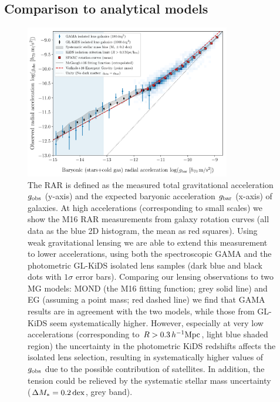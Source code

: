 \documentclass[usenatbib]{mnras}
\newcommand{\hMpc}{\, h^{-1}{\rm{Mpc}} }
\newcommand{\un}[1]{_{\rm #1}}
\newcommand{\dex}{\, {\rm dex}}
\begin{document}
\subsection{Comparison to analytical models}
\label{sec:results-analytical}

\begin{figure}
	\includegraphics[width=0.8\textwidth]{Figures/RAR_KiDS+GAMA+Verlinde_Nobins_isolated_zoomout.pdf}
	\caption{The RAR is defined as the measured total gravitational acceleration $g\un{obs}$ (y-axis) and the expected baryonic acceleration $g\un{bar}$ (x-axis) of galaxies. At high accelerations (corresponding to small scales) we show the M16 RAR measurements from galaxy rotation curves (all data as the blue 2D histogram, the mean as red squares). Using weak gravitational lensing we are able to extend this measurement to lower accelerations, using both the spectroscopic GAMA and the photometric GL-KiDS isolated lens samples (dark blue and black dots with $1\sigma$ error bars). Comparing our lensing observations to two MG models: MOND (the M16 fitting function; grey solid line) and EG (assuming a point mass; red dashed line) we find that GAMA results are in agreement with the two models, while those from GL-KiDS seem systematically higher. However, especially at very low accelerations (corresponding to $R > 0.3 \hMpc$, light blue shaded region) the uncertainty in the photometric KiDS redshifts affects the isolated lens selection, resulting in systematically higher values of $g\un{obs}$ due to the possible contribution of satellites. In addition, the tension could be relieved by the systematic stellar mass uncertainty ($\Delta M_*=0.2 \dex$, grey band).}
	\label{fig:RAR_kids_gama_verlinde}
\end{figure}
\end{document}
